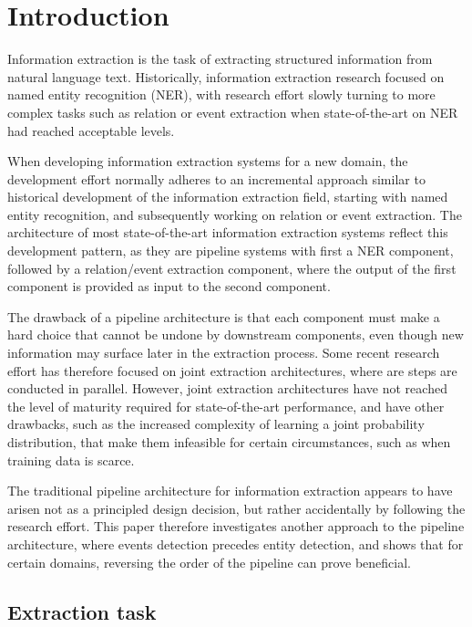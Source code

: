 \section{Introduction}

Information extraction is the task of extracting structured information from natural language text. Historically, information extraction research focused on named entity recognition (NER), with research effort slowly turning to more complex tasks such as relation or event extraction when state-of-the-art on NER had reached acceptable levels. 

When developing information extraction systems for a new domain, the development effort normally adheres to an incremental approach similar to historical development of the information extraction field, starting with named entity recognition, and subsequently working on relation or event extraction. The architecture of most state-of-the-art information extraction systems reflect this development pattern, as they are pipeline systems with first a NER component, followed by a relation/event extraction component, where the output of the first component is provided as input to the second component.

The drawback of a pipeline architecture is that each component must make a hard choice that cannot be undone by downstream components, even though new information may surface later in the extraction process. Some recent research effort has therefore focused on joint extraction architectures, where are steps are conducted in parallel. However, joint extraction architectures have not reached the level of maturity required for state-of-the-art performance, and have other drawbacks, such as the increased complexity of learning a joint probability distribution, that make them infeasible for certain circumstances, such as when training data is scarce.

The traditional pipeline architecture for information extraction appears to have arisen not as a principled design decision, but rather accidentally by following the research effort. This paper therefore investigates another approach to the pipeline architecture, where events detection precedes entity detection, and shows that for certain domains, reversing the order of the pipeline can prove beneficial.  

\subsection{Extraction task}

